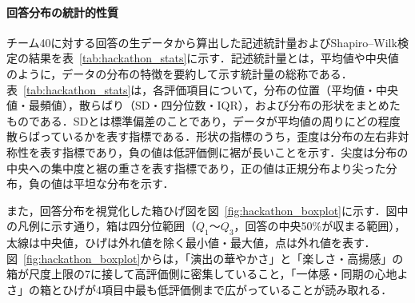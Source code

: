 \paragraph{回答分布の統計的性質}

チーム40に対する回答の生データから算出した記述統計量およびShapiro--Wilk検定\cite{shapiro1965}の結果を表~\ref{tab:hackathon_stats}に示す．記述統計量とは，平均値や中央値のように，データの分布の特徴を要約して示す統計量の総称である．表~\ref{tab:hackathon_stats}は，各評価項目について，分布の位置（平均値・中央値・最頻値），散らばり（SD・四分位数・IQR），および分布の形状をまとめたものである．SDとは標準偏差のことであり，データが平均値の周りにどの程度散らばっているかを表す指標である．形状の指標のうち，歪度は分布の左右非対称性を表す指標であり，負の値は低評価側に裾が長いことを示す．尖度は分布の中央への集中度と裾の重さを表す指標であり，正の値は正規分布より尖った分布，負の値は平坦な分布を示す．

\begin{table}[htbp]
  \centering
  \caption{参加者共通アンケートの記述統計量とShapiro--Wilk検定の結果（チーム40，$n=26$）}
  \label{tab:hackathon_stats}
\end{table}

また，回答分布を視覚化した箱ひげ図を図~\ref{fig:hackathon_boxplot}に示す．図中の凡例に示す通り，箱は四分位範囲（$Q_1$〜$Q_3$，回答の中央50\%が収まる範囲），太線は中央値，ひげは外れ値を除く最小値・最大値，点は外れ値を表す．図~\ref{fig:hackathon_boxplot}からは，「演出の華やかさ」と「楽しさ・高揚感」の箱が尺度上限の7に接して高評価側に密集していること，「一体感・同期の心地よさ」の箱とひげが4項目中最も低評価側まで広がっていることが読み取れる．

